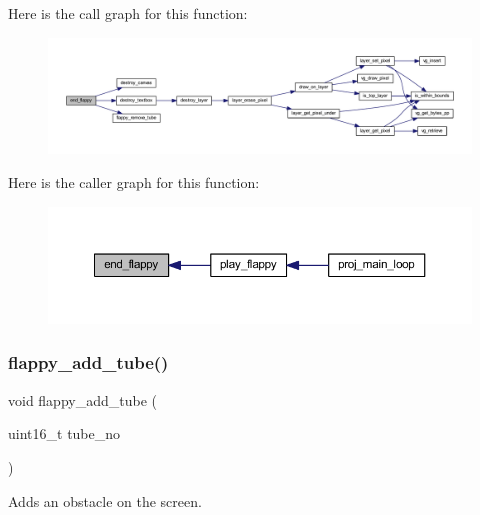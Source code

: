 Here is the call graph for this function\+:\nopagebreak
\begin{figure}[H]
\begin{center}
\leavevmode
\includegraphics[width=350pt]{group__flappy_gae94076e45a9cafba1b36efea470aea73_cgraph}
\end{center}
\end{figure}
Here is the caller graph for this function\+:\nopagebreak
\begin{figure}[H]
\begin{center}
\leavevmode
\includegraphics[width=350pt]{group__flappy_gae94076e45a9cafba1b36efea470aea73_icgraph}
\end{center}
\end{figure}
\mbox{\label{group__flappy_ga0ae0e6cba690a1cba3a4514879eb1987}} 
\subsubsection{\texorpdfstring{flappy\+\_\+add\+\_\+tube()}{flappy\_add\_tube()}}
{\footnotesize\ttfamily void flappy\+\_\+add\+\_\+tube (\begin{DoxyParamCaption}\item[{uint16\+\_\+t}]{tube\+\_\+no }\end{DoxyParamCaption})}



Adds an obstacle on the screen. 


